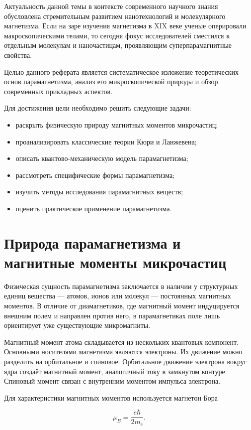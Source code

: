 \documentclass[a4paper,14pt]{extarticle}
\begin{document}
Актуальность данной темы в контексте современного научного знания обусловлена стремительным развитием нанотехнологий и молекулярного магнетизма. Если на заре изучения магнетизма в XIX веке ученые оперировали макроскопическими телами, то сегодня фокус исследователей сместился к отдельным молекулам и наночастицам, проявляющим суперпарамагнитные свойства.

Целью данного реферата является систематическое изложение теоретических основ парамагнетизма, анализ его микроскопической природы и обзор современных прикладных аспектов.

Для достижения цели необходимо решить следующие задачи:

\begin{itemize}
\item раскрыть физическую природу магнитных моментов микрочастиц;
\item проанализировать классические теории Кюри и Ланжевена;
\item описать квантово-механическую модель парамагнетизма;
\item рассмотреть специфические формы парамагнетизма;
\item изучить методы исследования парамагнитных веществ;
\item оценить практическое применение парамагнетизма.
\end{itemize}

\section{Природа парамагнетизма и магнитные моменты микрочастиц}

Физическая сущность парамагнетизма заключается в наличии у структурных единиц вещества — атомов, ионов или молекул — постоянных магнитных моментов. В отличие от диамагнетиков, где магнитный момент индуцируется внешним полем и направлен против него, в парамагнетиках поле лишь ориентирует уже существующие микромагниты.

Магнитный момент атома складывается из нескольких квантовых компонент. Основными носителями магнетизма являются электроны. Их движение можно разделить на орбитальное и спиновое. Орбитальное движение электрона вокруг ядра создаёт магнитный момент, аналогичный току в замкнутом контуре. Спиновый момент связан с внутренним моментом импульса электрона.

Для характеристики магнитных моментов используется магнетон Бора

\[
\mu_B = \frac{e\hbar}{2m_e}.
\]
\end{document}
